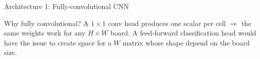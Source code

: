 \begin{frame}{Architecture 1: Fully-convolutional CNN}
{%
    }
    {\scriptsize
        \begin{highlightbox}{Why fully convolutional?}
            A $1{\times}1$ conv head produces one scalar per cell $\Rightarrow$ the
            same weights work for any $H \times W$ board. A feed-forward classification
            head would have the issue to create space for a $W$ matrix whose shape
            depend on the board size.
        \end{highlightbox}
    }
\end{frame}

